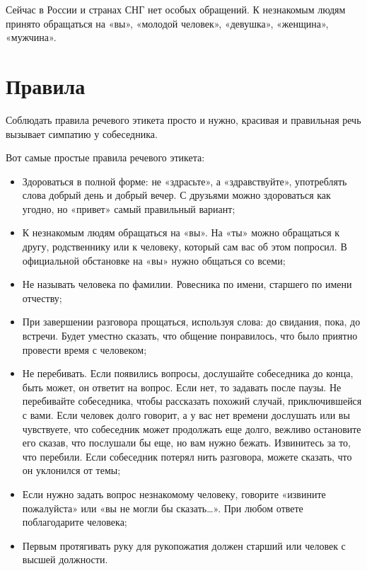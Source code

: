 \documentclass[a4paper, 12pt]{article}%
\begin{document}
Сейчас в России и странах СНГ нет особых обращений. К незнакомым людям принято обращаться на «вы», «молодой человек», «девушка», «женщина», «мужчина».

\section{Правила}

Соблюдать правила речевого этикета просто и нужно, красивая и правильная речь вызывает симпатию у собеседника.

Вот самые простые правила речевого этикета:

\begin{itemize}

\item Здороваться в полной форме: не «здрасьте», а «здравствуйте», употреблять слова добрый день и добрый вечер. С друзьями можно здороваться как угодно, но «привет» самый правильный вариант;
\item К незнакомым людям обращаться на «вы». На «ты» можно обращаться к другу, родственнику или к человеку, который сам вас об этом попросил. В официальной обстановке на «вы» нужно общаться со всеми;
\item Не называть человека по фамилии. Ровесника по имени, старшего по имени отчеству;
\item При завершении разговора прощаться, используя слова: до свидания, пока, до встречи. Будет уместно сказать, что общение понравилось, что было приятно провести время с человеком;
\item Не перебивать. Если появились вопросы, дослушайте собеседника до конца, быть может, он ответит на вопрос. Если нет, то задавать после паузы. Не перебивайте собеседника, чтобы рассказать похожий случай, приключившейся с вами. Если человек долго говорит, а у вас нет времени дослушать или вы чувствуете, что собеседник может продолжать еще долго, вежливо остановите его сказав, что послушали бы еще, но вам нужно бежать. Извинитесь за то, что перебили. Если собеседник потерял нить разговора, можете сказать, что он уклонился от темы;
\item Если нужно задать вопрос незнакомому человеку, говорите «извините пожалуйста» или «вы не могли бы сказать…». При любом ответе поблагодарите человека;
\item Первым протягивать руку для рукопожатия должен старший или человек с высшей должности.
\end{itemize}
\end{document}
